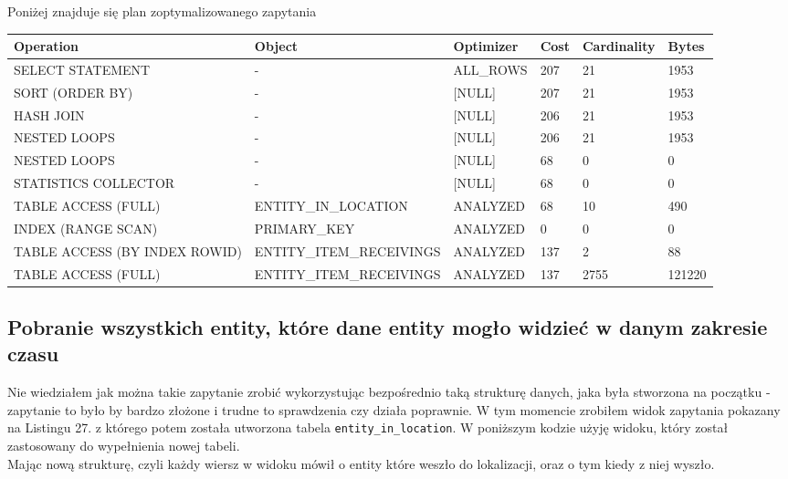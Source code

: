 \documentclass[11pt]{article}
\numberwithin{figure}{subsection}
\begin{document}
		Poniżej znajduje się plan zoptymalizowanego zapytania \\
		
		\begin{tabularx}{\textwidth}{|X|X|X|X|X|X|}
Operation&Object&Optimizer&Cost&Cardinality&Bytes\\ \hline
SELECT STATEMENT& - &ALL\_ROWS&207&21&1953\\ \hline
SORT (ORDER BY)& - &[NULL]&207&21&1953\\ \hline
HASH JOIN& - &[NULL]&206&21&1953\\ \hline
NESTED LOOPS& - &[NULL]&206&21&1953\\ \hline
NESTED LOOPS& - &[NULL]&68&0&0\\ \hline
STATISTICS COLLECTOR& - &[NULL]&68&0&0\\ \hline
TABLE ACCESS (FULL)&ENTITY\_IN\_LOCATION&ANALYZED&68&10&490\\ \hline
INDEX (RANGE SCAN)&PRIMARY\_KEY&ANALYZED&0&0&0\\ \hline
TABLE ACCESS (BY INDEX ROWID)&ENTITY\_ITEM\_RECEIVINGS&ANALYZED&137&2&88\\ \hline
TABLE ACCESS (FULL)&ENTITY\_ITEM\_RECEIVINGS&ANALYZED&137&2755&121220\\ \hline
		\end{tabularx}
		
		
		
		
		
		
		
		
		
		
		
	
	\subsection{Pobranie wszystkich entity, które dane entity mogło widzieć w
	danym zakresie czasu}
	
		Nie wiedziałem jak można takie zapytanie zrobić wykorzystując
		bezpośrednio taką strukturę danych, jaka była stworzona na początku -
		zapytanie to było by bardzo złożone i trudne to sprawdzenia czy działa
		poprawnie. W tym momencie zrobiłem widok zapytania pokazany na Listingu
		27. z którego potem
		została utworzona tabela \texttt{entity\_in\_location}. W poniższym
		kodzie użyję widoku, który został zastosowany do wypełnienia nowej
		tabeli.
		\\
		Mając nową strukturę, czyli każdy wiersz w widoku mówił o entity które
		weszło do lokalizacji, oraz o tym kiedy z niej wyszło.
			
\end{document}
